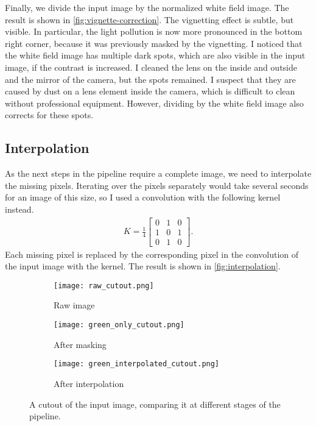 Finally, we divide the input image by the normalized white field image. The result is
shown in \autoref{fig:vignette-correction}. The vignetting effect is subtle, but visible.
In particular, the light pollution is now more pronounced in the bottom right corner,
because it was previously masked by the vignetting. I noticed that the white field image
has multiple dark spots, which are also visible in the input image, if the contrast is
increased. I cleaned the lens on the inside and outside and the mirror of the camera, but
the spots remained. I suspect that they are caused by dust on a lens element inside the
camera, which is difficult to clean without professional equipment. However, dividing by
the white field image also corrects for these spots.

\subsection{Interpolation}
\label{sec:interpolation}

As the next steps in the pipeline require a complete image, we need to interpolate the
missing pixels. Iterating over the pixels separately would take several seconds for an
image of this size, so I used a convolution with the following kernel instead.
\begin{align*}
  K = \frac{1}{4} \begin{bmatrix}
                    0 & 1 & 0 \\
                    1 & 0 & 1 \\
                    0 & 1 & 0
                  \end{bmatrix}.
\end{align*}
Each missing pixel is replaced by the corresponding pixel in the convolution of the input
image with the kernel. The result is shown in \autoref{fig:interpolation}.

\begin{figure}[tb]
  \centering
  \begin{subfigure}{.33\textwidth}
    \centering
    \texttt{[image: raw\_cutout.png]}
    \caption{Raw image}
  \end{subfigure}%
  \hfill
  \begin{subfigure}{.33\textwidth}
    \centering
    \texttt{[image: green\_only\_cutout.png]}
    \caption{After masking}
  \end{subfigure}%
  \hfill
  \begin{subfigure}{.33\textwidth}
    \centering
    \texttt{[image: green\_interpolated\_cutout.png]}
    \caption{After interpolation}
  \end{subfigure}
  \caption{A cutout of the input image, comparing it at different stages of the pipeline.}
  \label{fig:interpolation}
\end{figure}


